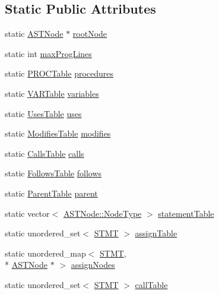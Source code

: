\subsection*{Static Public Attributes}
\begin{DoxyCompactItemize}
\item 
static \hyperlink{class_a_s_t_node}{A\-S\-T\-Node} $\ast$ \hyperlink{class_p_k_b_a5978f3d40a8d0bb732ba708440d499b8}{root\-Node}
\item 
static int \hyperlink{class_p_k_b_ae3b310bfb545d59911cd4f6bb54ebd94}{max\-Prog\-Lines}
\item 
static \hyperlink{class_p_r_o_c_table}{P\-R\-O\-C\-Table} \hyperlink{class_p_k_b_ae426b49eef5572e594a3a465e6e462b3}{procedures}
\item 
static \hyperlink{class_v_a_r_table}{V\-A\-R\-Table} \hyperlink{class_p_k_b_a04a10fef1b34afbe28d6e217e7e11d20}{variables}
\item 
static \hyperlink{class_uses_table}{Uses\-Table} \hyperlink{class_p_k_b_aec685879d658ff43471889ddbee175a9}{uses}
\item 
static \hyperlink{class_modifies_table}{Modifies\-Table} \hyperlink{class_p_k_b_acdeea65712ec5e26401bf04ca41fa526}{modifies}
\item 
static \hyperlink{class_calls_table}{Calls\-Table} \hyperlink{class_p_k_b_a7876c3653d636ee8a726941d0f98e3ae}{calls}
\item 
static \hyperlink{class_follows_table}{Follows\-Table} \hyperlink{class_p_k_b_a93dcc37be7f8e851ff4317925c07a9f5}{follows}
\item 
static \hyperlink{class_parent_table}{Parent\-Table} \hyperlink{class_p_k_b_a92894a22bbf3b6e449f30c6bee9f070a}{parent}
\item 
static vector$<$ \hyperlink{class_a_s_t_node_a4fd016b5f0e44ea6aca3542d27de3859}{A\-S\-T\-Node\-::\-Node\-Type} $>$ \hyperlink{class_p_k_b_a295e1559f863827d703055a49a1b888b}{statement\-Table}
\item 
static unordered\-\_\-set$<$ \hyperlink{std_afx_8h_a4a876b28ac3f59cecb39c2d2d76e4e7a}{S\-T\-M\-T} $>$ \hyperlink{class_p_k_b_a616513239f3fa6971424332dfabe0ead}{assign\-Table}
\item 
static unordered\-\_\-map$<$ \hyperlink{std_afx_8h_a4a876b28ac3f59cecb39c2d2d76e4e7a}{S\-T\-M\-T}, \\*
\hyperlink{class_a_s_t_node}{A\-S\-T\-Node} $\ast$ $>$ \hyperlink{class_p_k_b_a4bed7a639eeaebec0f877429f1b73079}{assign\-Nodes}
\item 
static unordered\-\_\-set$<$ \hyperlink{std_afx_8h_a4a876b28ac3f59cecb39c2d2d76e4e7a}{S\-T\-M\-T} $>$ \hyperlink{class_p_k_b_a4df9c934e4846c58863ed3513a1ff34a}{call\-Table}

\end{DoxyCompactItemize}
